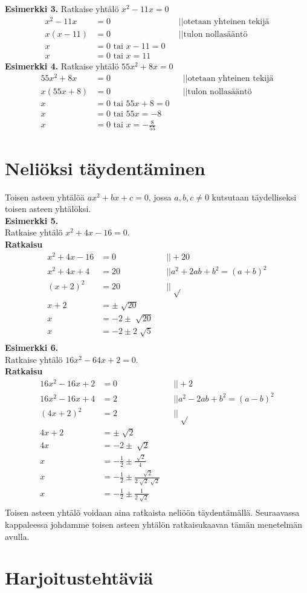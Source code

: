 \textbf{Esimerkki 3.}
Ratkaise yhtälö $x^2-11x=0$
\begin{align*}
x^2-11x&=0 \ \ \ \ \  &&||\text{otetaan yhteinen tekijä} \\
x(x-11)&=0 \ \ \ \ \ &&||\text{tulon nollasääntö} \\
x&=0 \text{ tai } x-11=0 \\ 
x&=0 \text{ tai } x=11
\end{align*} 
\textbf{Esimerkki 4.}
Ratkaise yhtälö $55x^2+8x=0$
\begin{align*}
55x^2+8x&=0 \ \ \ \ \ &&||\text{otetaan yhteinen tekijä} \\
x(55x+8)&=0 \ \ \ \ \ &&||\text{tulon nollasääntö} \\
x&=0 \text{ tai } 55x+8=0 \\
x&=0 \text{ tai } 55x=-8 \\
x&=0 \text{ tai } x=-\frac{8}{55}
\end{align*}
\section{Neliöksi täydentäminen}
Toisen asteen yhtälöä $ax^2+bx+c=0$, jossa $a,b,c \neq 0$ kutsutaan täydelliseksi toisen asteen yhtälöksi. \\ 
\textbf{Esimerkki 5.} \\
Ratkaise yhtälö $x^2+4x-16=0$. \\
\textbf{Ratkaisu} 
\begin{align*}
x^2+4x-16&=0 \ \ \ \ \ &&||+20 \\
x^2+4x+4&=20 \ \ \ \ \ &&||a^2+2ab+b^2=(a+b)^2 \\
(x+2)^2&=20 \ \ \ \ \ &&||\sqrt[]{} \\
x+2 &= \pm \sqrt[]{20} \\
x&=-2 \pm \sqrt[]{20} \\
x&=-2 \pm 2 \sqrt[]{5} \\
\end{align*}
\textbf{Esimerkki 6.} \\
Ratkaise yhtälö $16x^2-64x+2=0$. \\
\textbf{Ratkaisu} 
\begin{align*}
16x^2-16x+2&=0 \ \ \ \ \ &&||+2 \\
16x^2-16x+4&=2 \ \ \ \ \ &&||a^2-2ab+b^2=(a-b)^2 \\
(4x+2)^2&=2 \ \ \ \ \ &&|| \sqrt[]{} \\
4x+2&=\pm \sqrt[]{2} \\
4x&=-2 \pm \sqrt[]{2} \\
x&=-\frac{1}{2} \pm \frac{\sqrt[]{2}}{4} \\
x&=-\frac{1}{2} \pm \frac{\sqrt[]{2}}{ 2\sqrt[]{2}\sqrt[]{2}} \\
x&=-\frac{1}{2} \pm \frac{1}{2 \sqrt[]{2}} \\
\end{align*}
Toisen asteen yhtälö voidaan aina ratkaista neliöön täydentämällä. Seuraavassa kappaleessa johdamme toisen asteen yhtälön ratkaisukaavan tämän menetelmän avulla.
\section{Harjoitustehtäviä}
